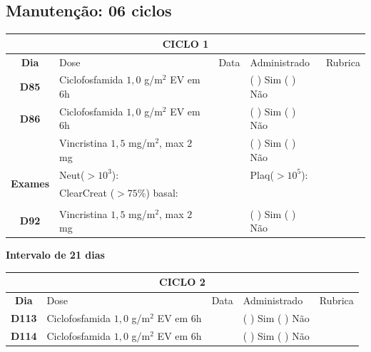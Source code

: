 \documentclass[11pt,a4paper,oldfontcommands]{memoir}
\begin{document}
\subsection{Manutenção: 06 ciclos}

\begin{center}
\begin{table}[H]
    \begin{tabular}{p{1cm}p{6cm}|p{1cm}|p{3cm}|p{2.5cm}}
    \hline
	\multicolumn{5}{c}{\textbf{CICLO 1}}\\
	\hline
    \multicolumn{1}{c|}{\multirow{1}{*}{\textbf{Dia}}}&{Dose}&{Data}&{Administrado}&{Rubrica} \\
    \hline
    \multicolumn{1}{c|}{\multirow{1}{*}{\textbf{D85}}}&{Ciclofosfamida \(1,0\) g/m\(^2\) EV em 6h}&&{(  ) Sim (  ) Não}&\\
    \multicolumn{1}{c|}{\multirow{1}{*}{\textbf{D86}}}&{Ciclofosfamida \(1,0\) g/m\(^2\) EV em 6h}&&{(  ) Sim (  ) Não}&\\
    \multicolumn{1}{c|}{\multirow{1}{*}{\textbf{}}}&{Vincristina \(1,5\) mg/m\(^2\), max \(2\) mg}&&{(  ) Sim (  ) Não}&\\
    \hline
    \multicolumn{1}{c|}{\multirow{2}{*}{\textbf{Exames}}}&\multicolumn{2}{l|}{Neut(\(>10^3\)):}&{Plaq(\(>10^5\)):}&\\
    \cline{2-5}
    \multicolumn{1}{c|}{\multirow{2}{*}{{}}}&\multicolumn{2}{l|}{ClearCreat (\(>75\%\)) basal:}&{}&{}\\
    \hline
    \\
    \hline
    \multicolumn{1}{c|}{\multirow{1}{*}{\textbf{D92}}}&{Vincristina \(1,5\) mg/m\(^2\), max \(2\) mg}&&{(  ) Sim (  ) Não}&\\
    \hline
\end{tabular}
\end{table}
\textbf{Intervalo de 21 dias}
\begin{table}[H]
\begin{tabular}{p{1cm}p{6cm}|p{1cm}|p{3cm}|p{2.5cm}}
    \hline
	\multicolumn{5}{c}{\textbf{CICLO 2}}\\
	\hline
    \multicolumn{1}{c|}{\multirow{1}{*}{\textbf{Dia}}}&{Dose}&{Data}&{Administrado}&{Rubrica} \\
    \hline
    \multicolumn{1}{c|}{\multirow{1}{*}{\textbf{D113}}}&{Ciclofosfamida \(1,0\) g/m\(^2\) EV em 6h}&&{(  ) Sim (  ) Não}&\\
    \multicolumn{1}{c|}{\multirow{1}{*}{\textbf{D114}}}&{Ciclofosfamida \(1,0\) g/m\(^2\) EV em 6h}&&{(  ) Sim (  ) Não}&\\

\end{tabular}
\end{table}
\end{center}
\end{document}

